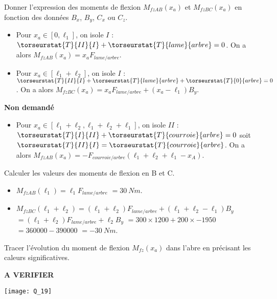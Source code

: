 \documentclass[11pt]{article}
\begin{document}
\UPSTIquestion Donner l'expression des moments de flexion $M_{fzAB}(x_a)$ et $M_{fzBC}(x_a)$ en fonction des données $B_x$, $B_y$, $C_x$ ou $C_z$.

\begin{UPSTIcorrige}
\begin{itemize}
\item Pour $x_a \in [0,\ell_1]$, on isole $I$ : $\torseurstat{T}{II}{I} + \torseurstat{T}{lame}{arbre} = 0$.  On  a alors 
$M_{fz AB}(x_a) = x_a  F_{lame/arbre}$. 
\item Pour $x_a \in [\ell_1+\ell_2]$, on isole $I$ : $\torseurstat{T}{II}{I} + \torseurstat{T}{lame}{arbre} + \torseurstat{T}{0}{arbre} = 0$.
On  a alors $M_{fz BC}(x_a) = x_a  F_{lame/arbre} + \left(x_a - \ell_1\right) B_y$. 
\end{itemize}

\textbf{Non demandé}
\begin{itemize}
\item Pour $x_a \in [\ell_1+\ell_2,\ell_1+\ell_2+\ell_1]$, on isole $II$ : $\torseurstat{T}{I}{II} + \torseurstat{T}{courroie}{arbre} = 0$ soit $\torseurstat{T}{II}{I} =\torseurstat{T}{courroie}{arbre} $.  On  a alors 
$M_{fz AB}(x_a) = -  F_{courroie/arbre} (\ell_1+\ell_2+\ell_1-x_A)$. 
\end{itemize}

\end{UPSTIcorrige}

\UPSTIquestion Calculer les valeurs des moments de flexion en B et C.

\begin{UPSTIcorrige}
\begin{itemize}
\item $M_{fz AB}(\ell_1) = \ell_1  F_{lame/arbre}$ $=\SI{30}{Nm}$.
\item $M_{fz BC}(\ell_1+\ell_2) =(\ell_1+\ell_2)  F_{lame/arbre} + \left(\ell_1+\ell_2 - \ell_1\right) B_y$
$=(\ell_1+\ell_2)  F_{lame/arbre}  +\ell_2 B_y$
$=300\times 1200+200 \times -1950$
$= 360 000-390 000$
$= -\SI{30}{Nm}$.
\end{itemize}

\end{UPSTIcorrige}

\UPSTIquestion Tracer l'évolution du moment de flexion $M_{fz}(x_a)$ dans l'abre en précisant les caleurs significatives. 

\begin{UPSTIcorrige}
\textbf{A VERIFIER}
\begin{center}
\texttt{[image: Q\_19]}
\end{center}
\end{UPSTIcorrige}
\end{document}
